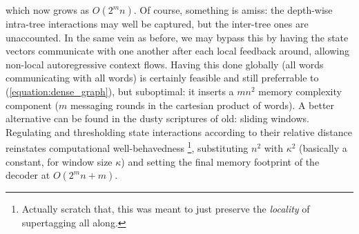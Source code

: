 which now grows as $O(2^m n)$.
Of course, something is amiss: the depth-wise intra-tree interactions may well be captured, but the inter-tree ones are unaccounted.
In the same vein as before, we may bypass this by having the state vectors communicate with one another after each local feedback around, allowing non-local autoregressive context flows.
Having this done globally (all words communicating with all words) is certainly feasible and still preferrable to (\ref{equation:dense_graph}), but suboptimal: it inserts a $mn^2$ memory complexity component ($m$ messaging rounds in the cartesian product of words).
A better alternative can be found in the dusty scriptures of old: sliding windows.
Regulating and thresholding state interactions according to their relative distance reinstates computational well-behavedness%
	\footnote{Actually scratch that, this was meant to just preserve the \textit{locality} of supertagging all along.},
substituting $n^2$ with $\kappa^2$ (basically a constant, for window size $\kappa$) and setting the final memory footprint of the decoder at $O(2^mn +m)$.
	
